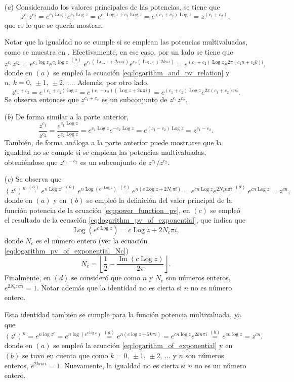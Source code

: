 \documentclass[a4paper]{report}
\renewcommand{\Im}{\operatorname{Im}}
\DeclareMathOperator{\Log}{Log}
\begin{document}
\begin{enumerate}
 \item[(\textit{a})] Considerando los valores principales de las potencias, se tiene que 
 \[
  z^{c_1}z^{c_2}=e^{c_1\Log z}e^{c_2\Log z}=e^{c_1\Log z+c_2\Log z}=e^{(c_1+c_2)\Log z}=z^(c_1+c_2),
 \]
 que es lo que se quería mostrar. 
 
 Notar que la igualdad no se cumple si se emplean las potencias multivaluadas, como se muestra en \cite{haber2019complex}. Efectivamente, en ese caso, por un lado se tiene que 
 \[
  z^{c_1}z^{c_2}=e^{c_1\log z}e^{c_2\log z}\overset{(a)}{=}e^{c_1(\Log z+2n\pi i)}e^{c_2(\Log z+2k\pi i)}
   =e^{(c_1+c_2)\Log z}e^{2\pi(c_1n+c_2k)i},
 \]
 donde en \((a)\) se empleó la ecuación \ref{eq:logarithm_and_pv_relation} y \(n,\,k=0,\,\pm1,\,\pm2,\,\dots\). Además, por otro lado,
 \[
  z^{c_1+c_2}=e^{(c_1+c_2)\log z}=e^{(c_1+c_2)(\Log z+2n\pi i)}=e^{(c_1+c_2)\Log z}e^{2\pi(c_1+c_2)ni}.
 \]
 Se observa entonces que \(z^{c_1+c_2}\) es un subconjunto de \(z^{c_1}z^{c_2}\).
 \item[(\textit{b})] De forma similar a la parte anterior,
 \[
  \frac{z^{c_1}}{z^{c_2}}=\frac{e^{c_1\Log z}}{e^{c_2\Log z}}=e^{c_1\Log z}e^{-c_2\Log z}=e^{(c_1-c_2)\Log z}=z^{c_1-c_2}.
 \]
 También, de forma análoga a la parte anterior puede mostrarse que la igualdad no se cumple si se emplean las potencias multivaluadas, obteniéndose que \(z^{c_1-c_2}\) es un subconjunto de \(z^{c_1}/z^{c_2}\).
 \item[(\textit{c})] Se observa que 
 \[
  (z^c)^n\overset{(a)}{=}e^{n\Log z^c}\overset{(b)}{=}e^{n\Log(e^{c\Log z})}
  \overset{(c)}{=}e^{n(c\Log z+2N_c\pi i)}
  =e^{cn\Log z}e^{2N_cn\pi i}
  \overset{(d)}{=}e^{cn\Log z}
  =z^{cn},
 \]
 donde en \((a)\) y en \((b)\) se empleó la definición del valor principal de la función potencia de la ecuación \ref{eq:power_function_pv}, en \((c)\) se empleó el resultado de la ecuación \ref{eq:logarithm_pv_of_exponential}, que indica que
 \[
  \Log(e^{c\Log z})=c\Log z+2N_c\pi i,  
 \]
 donde \(N_c\) es el número entero (ver la ecuación \ref{eq:logarithm_pv_of_exponential_Nc})
 \[
  N_c=\left\lfloor\frac{1}{2}-\frac{\Im(c\Log z)}{2\pi}\right\rfloor.
 \]
 Finalmente, en \((d)\) se consideró que como \(n\) y \(N_c\) son números enteros, \(e^{2N_cn\pi i}=1\). Notar además que la identidad no es cierta si \(n\) no es número entero.
 
 Esta identidad también se cumple para la función potencia multivaluada, ya que 
 \[
  (z^c)^n=e^{n\log z^c}=e^{n\log(e^{c\log z})}\overset{(a)}{=}e^{n(c\log z+2k\pi i)}
  =e^{cn\log z}e^{2kn\pi i}\overset{(b)}{=}e^{cn\log z}=z^{cn},
 \]
 donde en \((a)\) se empleó la ecuación  \ref{eq:logarithm_of_exponential} y en \((b)\) se tuvo en cuenta que como \(k=0,\,\pm1,\,\pm2,\,\dots\) y \(n\) son números enteros, \(e^{2kn\pi i}=1\). Nuevamente, la igualdad no es cierta si \(n\) no es un número entero.
\end{enumerate}
 
\end{document}
